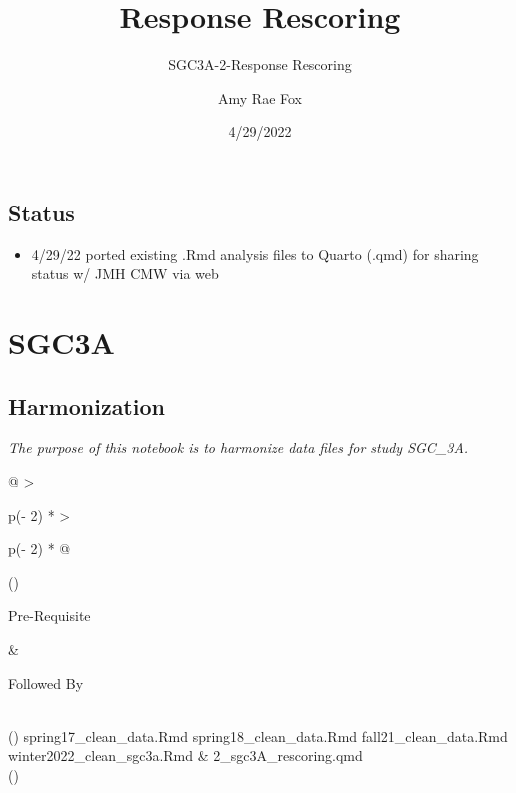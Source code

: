 \documentclass[
  letterpaper,
  DIV=11,
  numbers=noendperiod]{scrreprt}
\title{Response Rescoring}
\subtitle{SGC3A-2-Response Rescoring}
\author{Amy Rae Fox}
\date{4/29/2022}
\providecommand{\tightlist}{%
  \setlength{\itemsep}{0pt}\setlength{\parskip}{0pt}}\usepackage{longtable,booktabs,array}
\renewcommand*\contentsname{Table of contents}
\newcommand\contentsname{Table of contents}
\begin{document}
\maketitle

\ifdefined\Shaded\renewenvironment{Shaded}{\begin{tcolorbox}[borderline west={3pt}{0pt}{shadecolor}, breakable, sharp corners, interior hidden, enhanced, boxrule=0pt, frame hidden]}{\end{tcolorbox}}\fi

\renewcommand*\contentsname{Table of contents}
{
\hypersetup{linkcolor=}
\setcounter{tocdepth}{2}
\tableofcontents
}
\hypertarget{status}{%
\chapter*{Status}\label{status}}

\begin{itemize}
\tightlist
\item
  4/29/22 \textbar{} ported existing .Rmd analysis files to Quarto
  (.qmd) for sharing status w/ JMH CMW via web
\end{itemize}

\part{SGC3A}

\hypertarget{harmonization}{%
\chapter{Harmonization}\label{harmonization}}

\newpage

\emph{The purpose of this notebook is to harmonize data files for study
SGC\_3A.}

\begin{longtable}[]{@{}
  >{\raggedright\arraybackslash}p{(\columnwidth - 2\tabcolsep) * }
  >{\raggedright\arraybackslash}p{(\columnwidth - 2\tabcolsep) * }@{}}
\toprule()
\begin{minipage}[b]{\linewidth}\raggedright
Pre-Requisite
\end{minipage} & \begin{minipage}[b]{\linewidth}\raggedright
Followed By
\end{minipage} \\
\midrule()
\endhead
spring17\_clean\_data.Rmd spring18\_clean\_data.Rmd
fall21\_clean\_data.Rmd winter2022\_clean\_sgc3a.Rmd &
2\_sgc3A\_rescoring.qmd \\
\bottomrule()
\end{longtable}
\end{document}
